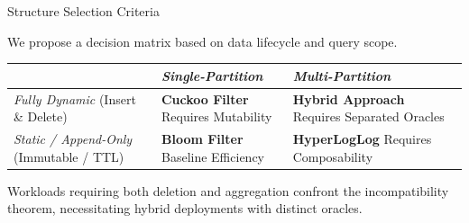 \documentclass{beamer}
\begin{document}
\begin{frame}{Structure Selection Criteria}

    We propose a decision matrix based on data lifecycle and query scope.

    \vspace{1em}

    \begin{center}
        \renewcommand{\arraystretch}{1.5}
        \begin{tabular}{ m{3.5cm} | m{3.5cm} | m{3.5cm} }
                                                                   & \emph{Single-Partition}                             & \emph{Multi-Partition}                                       \\
            \hline
            \emph{Fully Dynamic} \newline (Insert \& Delete)       & \textbf{Cuckoo Filter} \newline Requires Mutability & \textbf{Hybrid Approach} \newline Requires Separated Oracles \\
            \hline
            \emph{Static / Append-Only} \newline (Immutable / TTL) & \textbf{Bloom Filter} \newline Baseline Efficiency  & \textbf{HyperLogLog} \newline Requires Composability         \\
        \end{tabular}
    \end{center}

    \vspace{1em}

    Workloads requiring both deletion and aggregation confront the incompatibility theorem, necessitating hybrid deployments with distinct oracles.

\end{frame}




\end{document}
